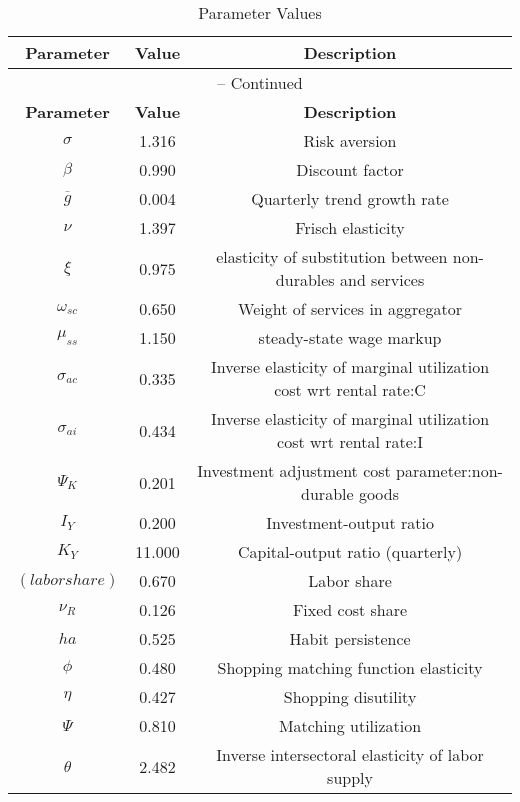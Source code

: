 \begin{center}
\begin{longtable}{ccc}
\caption{Parameter Values}\\%
\toprule%
\multicolumn{1}{c}{\textbf{Parameter}} &
\multicolumn{1}{c}{\textbf{Value}} &
 \multicolumn{1}{c}{\textbf{Description}}\\%
\midrule%
\endfirsthead
\multicolumn{3}{c}{{\tablename} \thetable{} -- Continued}\\%
\midrule%
\multicolumn{1}{c}{\textbf{Parameter}} &
\multicolumn{1}{c}{\textbf{Value}} &
  \multicolumn{1}{c}{\textbf{Description}}\\%
\midrule%
\endhead
${\sigma}$ 	 & 	 1.316 	 & 	 Risk aversion\\
${\beta}$ 	 & 	 0.990 	 & 	 Discount factor\\
${\overline{g}}$ 	 & 	 0.004 	 & 	 Quarterly trend growth rate\\
$\nu$ 	 & 	 1.397 	 & 	 Frisch elasticity\\
$\xi$ 	 & 	 0.975 	 & 	 elasticity of substitution between non-durables and services\\
$\omega_{sc}$ 	 & 	 0.650 	 & 	 Weight of services in aggregator\\
$\mu_{ss}$ 	 & 	 1.150 	 & 	 steady-state wage markup\\
${\sigma_{ac}}$ 	 & 	 0.335 	 & 	 Inverse elasticity of marginal utilization cost wrt rental rate:C\\
${\sigma_{ai}}$ 	 & 	 0.434 	 & 	 Inverse elasticity of marginal utilization cost wrt rental rate:I\\
${\Psi_{K}}$ 	 & 	 0.201 	 & 	 Investment adjustment cost parameter:non-durable goods\\
${I_Y}$ 	 & 	 0.200 	 & 	 Investment-output ratio\\
${K_Y}$ 	 & 	 11.000 	 & 	 Capital-output ratio (quarterly)\\
$(labor share)$ 	 & 	 0.670 	 & 	 Labor share\\
${\nu_R}$ 	 & 	 0.126 	 & 	 Fixed cost share\\
${ha}$ 	 & 	 0.525 	 & 	 Habit persistence\\
${\phi}$ 	 & 	 0.480 	 & 	 Shopping matching function elasticity\\
${\eta}$ 	 & 	 0.427 	 & 	 Shopping disutility\\
${\Psi}$ 	 & 	 0.810 	 & 	 Matching utilization\\
${\theta}$ 	 & 	 2.482 	 & 	 Inverse intersectoral elasticity of labor supply\\

\end{longtable}
\end{center}
